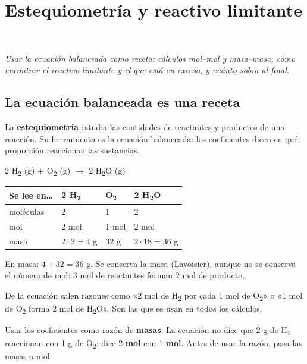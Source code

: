 \section[Estequiometría y reactivo limitante]{Estequiometría y reactivo limitante}
\modcomun\ \ {\color{gris}\itshape Usar la ecuación balanceada como receta: cálculos mol--mol y masa--masa, cómo encontrar el reactivo limitante y el que está en exceso, y cuánto sobra al final.\par}
\subsection{La ecuación balanceada es una receta}
La \textbf{estequiometría} estudia las cantidades de reactantes y productos de una reacción. Su herramienta es la ecuación balanceada: los coeficientes dicen en qué proporción reaccionan las sustancias.

 
\begin{center}
2 H\textsubscript{2} (g) + O\textsubscript{2} (g) \ensuremath{\rightarrow} 2 H\textsubscript{2}O (g)
\end{center}
 
\begin{center}\small
\begin{tabular}{@{}llll@{}}
\toprule
\textbf{Se lee en\dots{}} & \textbf{2 H\textsubscript{2}} & \textbf{O\textsubscript{2}} & \textbf{2 H\textsubscript{2}O} \\
\midrule
moléculas & 2 & 1 & 2 \\
mol & 2 mol & 1 mol & 2 mol \\
masa & $2\cdot 2 = 4$ g & 32 g & $2\cdot 18 = 36$ g \\
\bottomrule
\end{tabular}
\end{center}
 

En masa: $4 + 32 = 36$ g.  Se conserva la masa (Lavoisier), aunque no se conserva el número de mol: 3 mol de reactantes forman 2 mol de producto.

  
\begin{clave} De la ecuación salen razones como «2 mol de H\textsubscript{2} por cada 1 mol de O\textsubscript{2}» o «1 mol de O\textsubscript{2} forma 2 mol de H\textsubscript{2}O». Son las que se usan en todos los cálculos.\end{clave}
 
\begin{ojo} Usar los coeficientes como razón de \textbf{masas}. La ecuación no dice que 2 g de H\textsubscript{2} reaccionan con 1 g de O\textsubscript{2}: dice 2 \textbf{mol} con 1 \textbf{mol}. Antes de usar la razón, pasa las masas a mol.\end{ojo}
 
